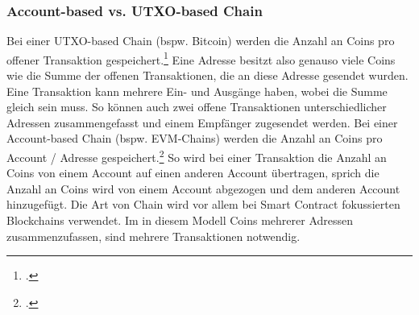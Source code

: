 \subsubsection{Account-based vs. UTXO-based Chain}
\label{sec:definition-account-based-vs-utxo-based-chain}
\noindent
Bei einer UTXO-based Chain (bspw. Bitcoin) werden die Anzahl an Coins pro offener Transaktion gespeichert.\footcite[Vgl. hierzu, im Folgenden und weiterführend][S. 182 ff\adddot]{q5}
Eine Adresse besitzt also genauso viele Coins wie die Summe der offenen Transaktionen, die an diese Adresse gesendet wurden.
Eine Transaktion kann mehrere Ein- und Ausgänge haben, wobei die Summe gleich sein muss.
So können auch zwei offene Transaktionen unterschiedlicher Adressen zusammengefasst und einem Empfänger zugesendet werden.
\bigbreak
\noindent
Bei einer Account-based Chain (bspw. EVM-Chains) werden die Anzahl an Coins pro Account / Adresse gespeichert.\footcite[Vgl. hierzu und im Folgenden][]{w16} 
So wird bei einer Transaktion die Anzahl an Coins von einem Account auf einen anderen Account übertragen, sprich die Anzahl an Coins wird von einem Account abgezogen und dem anderen Account hinzugefügt.
Die Art von Chain wird vor allem bei Smart Contract fokussierten Blockchains verwendet.
Im in diesem Modell Coins mehrerer Adressen zusammenzufassen, sind mehrere Transaktionen notwendig.
